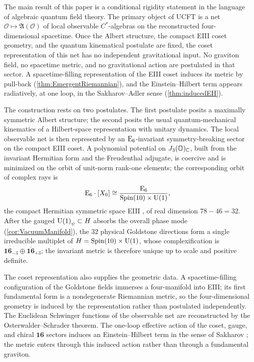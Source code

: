 \documentclass[pdflatex,sn-mathphys-num]{sn-jnl}
\theoremstyle{thmstyleone}
\theoremstyle{thmstylethree}%
\theoremstyle{thmstyletwo}%
\begin{document}
The main result of this paper is a conditional rigidity statement in the
language of algebraic quantum field theory. The primary object of UCFT is a
net \(\mathcal O\mapsto\mathfrak A(\mathcal O)\) of local observable
\(C^{*}\)-algebras on the reconstructed four-dimensional spacetime. Once the
Albert structure, the compact EIII coset geometry, and the quantum
kinematical postulate are fixed, the coset representation of this net has no
independent gravitational input. No graviton field, no spacetime metric, and no
gravitational action are postulated in that sector. A spacetime-filling
representation of the EIII coset induces its metric by pull-back
(\autoref{thm:EmergentRiemannian}), and the Einstein--Hilbert term appears
radiatively, at one loop, in the Sakharov--Adler sense
(\autoref{thm:inducedEH}).

The construction rests on two postulates. The first postulate posits a maximally
symmetric Albert structure; the second posits the usual quantum-mechanical
kinematics of a Hilbert-space representation with unitary dynamics. The local
observable net is then represented by an $\mathrm{E}_{6}$-invariant symmetry-breaking
sector on the compact EIII coset. A polynomial potential on $J_3(\mathbb{O})_{\mathbb C}$,
built from the invariant Hermitian form and the Freudenthal adjugate, is
coercive and is minimized on the orbit of unit-norm rank-one elements; the
corresponding orbit of complex rays is
\[
  \mathrm{E}_{6}\cdot [X_{0}]\cong\frac{\mathrm{E}_{6}}{\operatorname{Spin}(10) \times \mathrm{U(1)}},
\]
the compact Hermitian symmetric space EIII \cite{Helgason:1978}, of real
dimension $78-46=32$. After the gauged $\mathrm{U(1)}_\psi\subset H$ absorbs the
overall phase mode (\autoref{cor:VacuumManifold}), the $32$ physical Goldstone
directions form a single irreducible
multiplet of $H=\operatorname{Spin}(10) \times \mathrm{U(1)}$, whose complexification is
$\mathbf{16}_{-3}\oplus\overline{\mathbf{16}}_{+3}$; the invariant metric is
therefore unique up to scale and positive definite.

The coset representation also supplies the geometric data. A
spacetime-filling configuration of the Goldstone fields immerses a
four-manifold into EIII; its first fundamental form is a nondegenerate
Riemannian metric, so the four-dimensional geometry is induced by the
representation rather than postulated independently. The Euclidean Schwinger
functions of the observable net are reconstructed by the
Osterwalder--Schrader theorem. The one-loop effective action of the coset,
gauge, and chiral \(\mathbf{16}\) sectors induces an Einstein--Hilbert term in
the sense of Sakharov \cite{SakharovInducedGravity,AdlerInducedGravity}; the
metric enters through this induced action rather than through a fundamental
graviton.
\end{document}
